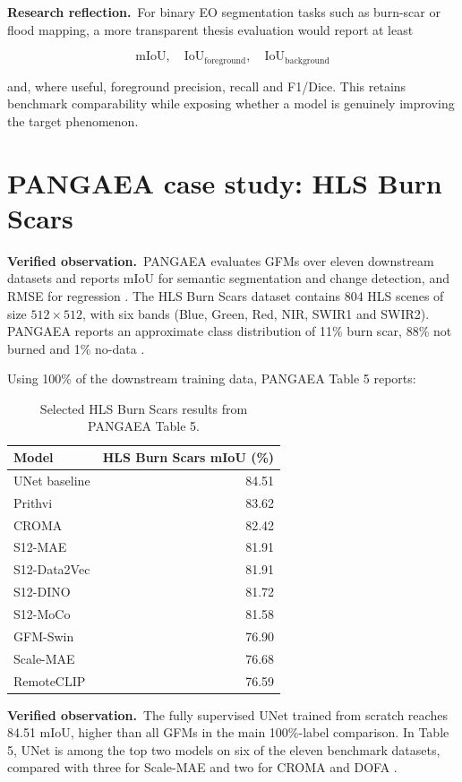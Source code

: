 \documentclass[11pt,a4paper]{article}
\newcommand{\verified}{\textcolor{verifiedgreen}{\textbf{Verified observation.}}}
\newcommand{\reflection}{\textcolor{reflectionorange}{\textbf{Research reflection.}}}
\begin{document}
\reflection\ For binary EO segmentation tasks such as burn-scar or flood mapping, a more
transparent thesis evaluation would report at least

\[
\boxed{\mathrm{mIoU},\quad
\mathrm{IoU}_{\mathrm{foreground}},\quad
\mathrm{IoU}_{\mathrm{background}}}
\]

and, where useful, foreground precision, recall and F1/Dice. This retains benchmark
comparability while exposing whether a model is genuinely improving the target phenomenon.

\section{PANGAEA case study: HLS Burn Scars}

\verified\ PANGAEA evaluates GFMs over eleven downstream datasets and reports mIoU for
semantic segmentation and change detection, and RMSE for regression \cite{pangaea}. The HLS
Burn Scars dataset contains 804 HLS scenes of size \(512\times512\), with six bands
(Blue, Green, Red, NIR, SWIR1 and SWIR2). PANGAEA reports an approximate class distribution
of 11\% burn scar, 88\% not burned and 1\% no-data \cite{pangaea}.

Using 100\% of the downstream training data, PANGAEA Table 5 reports:

\begin{table}[h]
\centering
\small
\begin{tabular}{lr}
\toprule
Model & HLS Burn Scars mIoU (\%) \\
\midrule
UNet baseline & 84.51 \\
Prithvi & 83.62 \\
CROMA & 82.42 \\
S12-MAE & 81.91 \\
S12-Data2Vec & 81.91 \\
S12-DINO & 81.72 \\
S12-MoCo & 81.58 \\
GFM-Swin & 76.90 \\
Scale-MAE & 76.68 \\
RemoteCLIP & 76.59 \\
\bottomrule
\end{tabular}
\caption{Selected HLS Burn Scars results from PANGAEA Table 5.}
\end{table}

\verified\ The fully supervised UNet trained from scratch reaches 84.51 mIoU, higher than all
GFMs in the main 100\%-label comparison. In Table 5, UNet is among the top two models on six
of the eleven benchmark datasets, compared with three for Scale-MAE and two for CROMA and
DOFA \cite{pangaea}.
\end{document}
